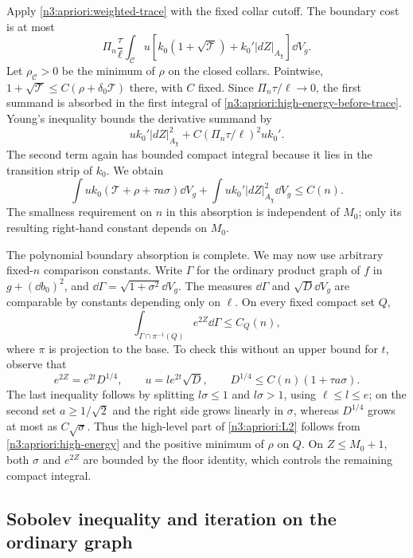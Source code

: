 Apply \eqref{n3:apriori:weighted-trace} with the fixed collar cutoff.
The boundary cost is at most
\[
 \Pi_n\frac\tau\ell\int_{\mathcal C}u
       \left[k_0(1+\sqrt{\mathcal T})
                              +k_0'|dZ|_{A_\chi}\right]\dd V_g.
\]
Let $\rho_{\mathcal C}>0$ be the minimum of $\rho$ on the closed
collars.  Pointwise,
$1+\sqrt{\mathcal T}\le C(\rho+\delta_0\mathcal T)$ there, with
$C$ fixed.  Since $\Pi_n\tau/\ell\to0$, the first summand is
absorbed in the first integral of
\eqref{n3:apriori:high-energy-before-trace}.  Young's inequality bounds
the derivative summand by
\[
 u k_0'|dZ|_{A_\chi}^2+
          C(\Pi_n\tau/\ell)^2u k_0'.
\]
The second term again has bounded compact integral because it lies
in the transition strip of $k_0$.  We obtain
\begin{equation}
 \int u k_0(\mathcal T+\rho+\tau a\sigma)\dd V_g
       +\int u k_0'|dZ|_{A_\chi}^2\dd V_g\le C(n).
 \label{n3:apriori:high-energy}
\end{equation}
The smallness requirement on $n$ in this absorption is independent
of $M_0$; only its resulting right-hand constant depends on $M_0$.

The polynomial boundary absorption is complete. We may now use
arbitrary fixed-$n$ comparison constants. Write
$\Gamma$ for the ordinary product graph of $f$ in $g+(\dd b_0)^2$,
and $\dd\Gamma=\sqrt{1+\sigma^2}\dd V_g$.  The measures
$\dd\Gamma$ and $\sqrt D\dd V_g$ are comparable by constants
depending only on $\ell$.  On every fixed compact set $Q$,
\begin{equation}
 \int_{\Gamma\cap\pi^{-1}(Q)}e^{2Z}\dd\Gamma\le C_Q(n),
 \label{n3:apriori:L2}
\end{equation}
where $\pi$ is projection to the base.  To check this without an
upper bound for $t$, observe that
\[
 e^{2Z}=e^{2t}D^{1/4},\qquad u=le^{2t}\sqrt D,
 \qquad D^{1/4}\le C(n)(1+\tau a\sigma).
\]
The last inequality follows by splitting $l\sigma\le1$ and
$l\sigma>1$, using $\ell\le l\le e$; on the second set
$a\ge1/\sqrt2$ and the right side grows linearly in $\sigma$,
whereas $D^{1/4}$ grows at most as $C\sqrt\sigma$.
Thus the high-level part of \eqref{n3:apriori:L2} follows from
\eqref{n3:apriori:high-energy} and the positive minimum of $\rho$ on
$Q$.  On $Z\le M_0+1$, both $\sigma$ and $e^{2Z}$ are bounded
by the floor identity, which controls the remaining compact integral.

\subsection{Sobolev inequality and iteration on the ordinary graph}

